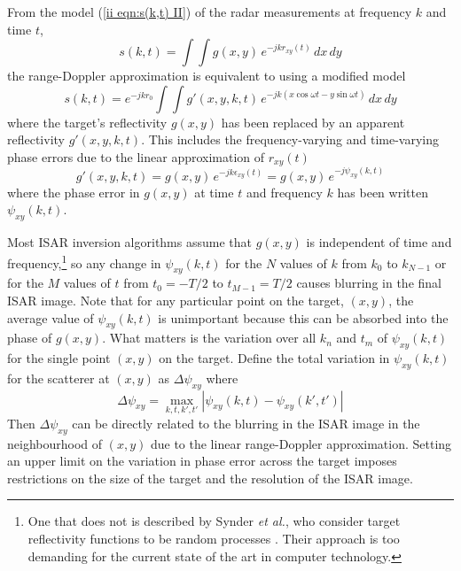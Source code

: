 From the model (\ref{ii eqn:s(k,t) II}) of the radar measurements at 
frequency $k$ and time $t$, 
\begin{equation}
s(k,t)=\int\!\!\int g(x,y)\,e^{-jkr_{xy}(t)}\,dx\,dy
\end{equation}
the range-Doppler approximation is equivalent to using a modified model
\begin{equation}
s(k,t)=e^{-jkr_0}
\int\!\!\int g'(x,y,k,t)\,e^{-jk(x\cos\omega t-y\sin\omega t)}\,dx\,dy
\end{equation}
where the target's reflectivity $g(x,y)$ has been replaced by an apparent
reflectivity $g'(x,y,k,t)$.  This includes the frequency-varying
and time-varying phase errors due to the linear approximation of 
$r_{xy}(t)$
\begin{equation}
g'(x,y,k,t)=g(x,y)\,e^{-jk\epsilon_{xy}(t)}=g(x,y)\,e^{-j\psi_{xy}(k,t)}
\end{equation}
where the phase error in $g(x,y)$ at time $t$ and frequency $k$ has been
written $\psi_{xy}(k,t)$.  

Most ISAR inversion algorithms assume that $g(x,y)$ is independent of time
and frequency,\footnote{One that does not is described by Synder {\em et
al.}, who consider target reflectivity functions to be random processes 
\protect\cite{Sny89}.  Their approach is too demanding for the 
current state of the art in computer technology.} 
so any change in $\psi_{xy}(k,t)$ for the $N$ values of
$k$ from $k_0$ to $k_{N-1}$ or for the $M$ values of $t$ from $t_0=-T/2$ to
$t_{M-1}=T/2$ causes blurring in the final ISAR image.  Note that for any
particular point on the target, $(x,y)$, the average value of 
$\psi_{xy}(k,t)$ is unimportant because this can be absorbed into the
phase of $g(x,y)$.  What matters is the variation over all $k_n$ and $t_m$
of $\psi_{xy}(k,t)$ for the single point $(x,y)$ on the target.  
Define the total variation in $\psi_{xy}(k,t)$ for the scatterer at $(x,y)$
as $\Delta\psi_{xy}$ where
\begin{equation}
\label{rmc eqn:Dpsi}
\Delta\psi_{xy}=\max_{k,t,k',t'}\left|\psi_{xy}(k,t)-\psi_{xy}(k',t')\right|
\end{equation}
Then $\Delta\psi_{xy}$ can be directly related to the blurring in the ISAR
image in the neighbourhood of $(x,y)$ due to the linear range-Doppler
approximation.  Setting an upper limit on the variation in phase error
across the target imposes restrictions on the size of the target and the
resolution of the ISAR image.

